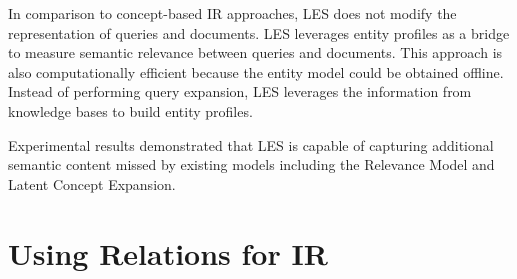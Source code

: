 \documentclass[letterpaper,12pt]{article}
\begin{document}
In comparison to concept-based IR approaches, LES does not modify the representation of queries and documents. LES leverages entity profiles as a bridge to measure semantic relevance between queries and documents. This approach is also computationally efficient because the entity model could be obtained offline. Instead of performing query expansion, LES leverages the information from knowledge bases to build entity profiles.

Experimental results demonstrated that LES is capable of capturing additional semantic content missed by existing models including the Relevance Model and Latent Concept Expansion.

\section{Using Relations for IR}
\end{document}
